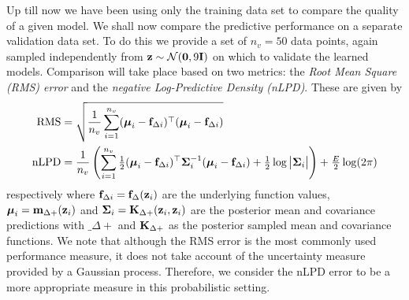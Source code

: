 Up till now we have been using only the training data set to compare the quality of a given model. We shall now compare the predictive performance on a separate validation data set. To do this we provide a set of $n_v = 50$ data points, again sampled independently from $\mathbf{z} \sim \mathcal{N}(\mathbf{0},9\mathbf{I})$ on which to validate the learned models. Comparison will take place based on two metrics: the \textit{Root Mean Square (RMS) error} and the \textit{negative Log-Predictive Density (nLPD)}. These are given by
\begin{align}
\text{RMS} &= \sqrt{ \frac{1}{n_v} \sum_{i=1}^{n_v} (\boldsymbol{\mu}_i - \mathbf{f}_{\Delta i})^\top(\boldsymbol{\mu}_i - \mathbf{f}_{\Delta i}) } \\
\text{nLPD} &= \frac{1}{n_v} \left( \sum_{i=1}^{n_v} \tfrac{1}{2}(\boldsymbol{\mu}_i - \mathbf{f}_{\Delta i})^\top\boldsymbol{\Sigma}_i^{-1}(\boldsymbol{\mu}_i - \mathbf{f}_{\Delta i}) 
+ \tfrac{1}{2}\log\big|\boldsymbol{\Sigma}_i\big| \right) + \tfrac{E}{2}\log(2\pi)
\end{align}
respectively where $\mathbf{f}_{\Delta i} = \mathbf{f}_{\Delta}(\mathbf{z}_i)$ are the underlying function values, $\boldsymbol{\mu}_i = \mathbf{m}_{\Delta +}(\mathbf{z}_i)$ and $\boldsymbol{\Sigma}_i = \mathbf{K}_{\Delta +}(\mathbf{z}_i,\mathbf{z}_i)$ are the posterior mean and covariance predictions with $\bm_{\Delta +}$ and $\mathbf{K}_{\Delta +}$ as the posterior sampled mean and covariance functions. We note that although the RMS error is the most commonly used performance measure, it does not take account of the uncertainty measure provided by a Gaussian process. Therefore, we consider the nLPD error to be a more appropriate measure in this probabilistic setting.



